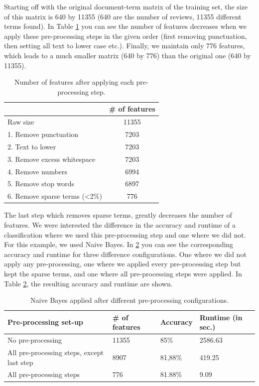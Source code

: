 \documentclass[a4paper,11pt]{article}
\begin{document}
Starting off with the original document-term matrix of the training set, the size of this matrix is 640 by 11355 (640 are the number of reviews, 11355 different terms found). In Table \ref{table:pre-processing} you can see the number of features decreases when we apply these pre-processing steps in the given order (first removing punctuation, then setting all text to lower case etc.). Finally, we maintain only 776 features, which leads to a much smaller matrix (640 by 776) than the original one (640 by 11355). 

\begin{table}[H]
\centering
\caption{Number of features after applying each pre-processing step.}
\label{table:pre-processing}
\begin{tabular}{|l|c|}
\hline
                                   & \# of features \\
\hline
Raw size                           & 11355          \\
1. Remove punctuation                 & 7203           \\
2. Text to lower                      & 7203           \\
3. Remove excess whitespace           & 7203           \\
4. Remove numbers           		   & 6994           \\
5. Remove stop words                  & 6897           \\
6. Remove sparse terms (\textless2\%) & 776           	\\
\hline
\end{tabular}
\end{table}

The last step which removes sparse terms, greatly decreases the number of features. We were interested the difference in the accuracy and runtime of a classification where we used this pre-processing step and one where we did not. For this example, we used Naive Bayes. In \ref{table:pre-configs} you can see the corresponding accuracy and runtime for three difference configurations. One where we did not apply any pre-processing, one where we applied every pre-processing step but kept the sparse terms, and one where all pre-processing steps were applied. In Table \ref{table:pre-configs}, the resulting accuracy and runtime are shown.

\begin{table}[H]
\centering
\caption{Naive Bayes applied after different pre-processing configurations.}
\label{table:pre-configs}
\begin{tabular}{|l|l|l|l|}
\hline
Pre-processing set-up 			 & \# of features & Accuracy & Runtime (in sec.) \\
\hline
No pre-processing                & 11355          & 85\%     & 2586.63           \\
All pre-processing steps, except last step & 8907           & 81,88\%  & 419.25            \\
All pre-processing steps         & 776            & 81.88\%  & 9.09              \\
\hline
\end{tabular}
\end{table}
\end{document}
